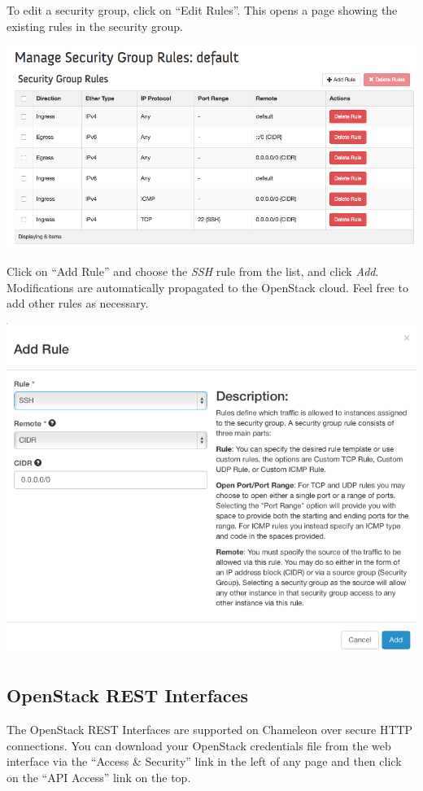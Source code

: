 To edit a security group, click on ``Edit Rules''. This opens a page
showing the existing rules in the security group.

\includegraphics[width=0.8\columnwidth]{images/chameleon/openstack_alamo_edit_rules.png}

Click on ``Add Rule'' and choose the \emph{SSH} rule from the list, and
click \emph{Add}. Modifications are automatically propagated to the
OpenStack cloud. Feel free to add other rules as necessary.

\includegraphics[width=0.8\columnwidth]{images/chameleon/openstack_alamo_add_secgroup_rule.png}

\subsection{OpenStack REST Interfaces}\label{openstack-rest-interfaces}

The OpenStack REST Interfaces are supported on Chameleon over secure
HTTP connections. You can download your OpenStack credentials file from
the web interface via the ``Access \& Security'' link in the left of any
page and then click on the ``API Access'' link on the top.

